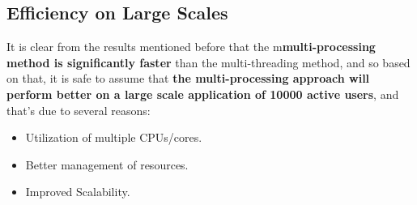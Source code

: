 \documentclass[pdftex,12pt,a4paper]{article}
\begin{document}
\subsection{Efficiency on Large Scales}
It is clear from the results mentioned before that the m\textbf{multi-processing method is significantly faster} than the multi-threading method, and so based on that, it is safe to assume that \textbf{the multi-processing approach will perform better on a large scale application of 10000 active users}, and that's due to several reasons:
\begin{itemize}
\item Utilization of multiple CPUs/cores.
\item Better management of resources.
\item Improved Scalability.
\end{itemize}
\end{document}
